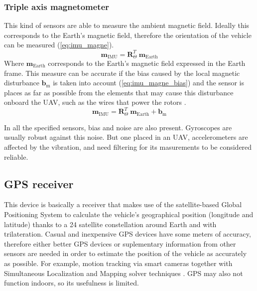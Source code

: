 \documentclass[journal]{IEEEtran}
\newcommand*{\subb}[1]{_{\mathrm{#1}}}
\begin{document}
		\subsubsection{Triple axis magnetometer} This kind of sensors are able to measure the ambient magnetic field. Ideally this corresponds to the Earth's magnetic field, therefore the orientation of the vehicle can be measured (\ref{eq:imu_magne}).
		\begin{equation} \label{eq:imu_magne}
		\bm{m}\subb{IMU}= \bm{R}^T_\Theta \  \bm{m}\subb{Earth}
		\end{equation}
		Where $\bm{m}\subb{Earth}$ corresponds to the Earth's magnetic field expressed in the Earth frame. This measure can be accurate if the bias caused by the local magnetic disturbance $\bm{b}\subb{m}$ is taken into account (\ref{eq:imu_magne_bias}) and the sensor is places as far as possible from the elements that may cause this disturbance onboard the UAV, such as the wires that power the rotors \cite{modelling_control_mahony}.
		\begin{equation} \label{eq:imu_magne_bias}
		\bm{m}\subb{IMU}= \bm{R}^T_\Theta \  \bm{m}\subb{Earth} + \bm{b}\subb{m}
		\end{equation}
		
		In all the specified sensors, bias and noise are also present. Gyroscopes are usually robust against this noise. But one placed in an UAV, accelerometers are affected by the vibration, and need filtering for its masurements to be considered reliable.
		
		\subsection{GPS receiver}
		This device is basically a receiver that makes use of the satellite-based Global Positioning System to calculate the vehicle's geographical position (longitude and latitude) thanks to a 24 satellite constellation around Earth and with trilateration. Casual and inexpensive GPS devices have some meters of accuracy, therefore either better GPS devices or suplementary information from other sensors are needed in order to estimate the position of the vehicle as accurately as possible. For example, motion tracking via smart cameras together with Simultaneous Localization and Mapping solver techniques \cite{modelling_control_mahony}. GPS may also not function indoors, so its usefulness is limited.
		
\end{document}

